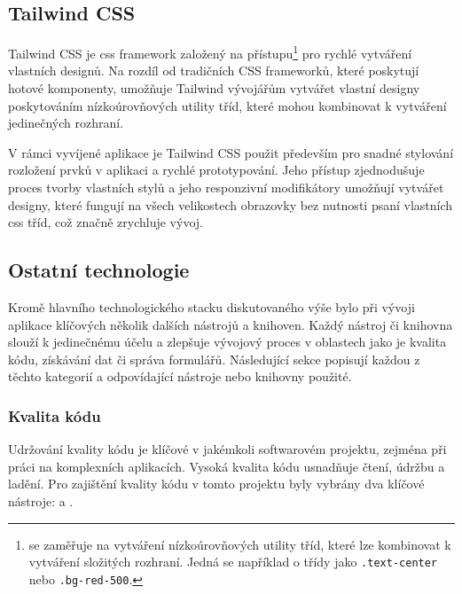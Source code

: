 \subsection{Tailwind CSS}
\label{subsec:implementace-technologie-tailwind}
Tailwind CSS je \ac{css} framework založený na  přístupu\footnote{ se zaměřuje na vytváření nízkoúrovňových utility tříd, které lze kombinovat k vytváření složitých rozhraní.
Jedná se například o třídy jako \texttt{.text-center} nebo \texttt{.bg-red-500}.} pro rychlé vytváření vlastních designů.
Na rozdíl od tradičních CSS frameworků, které poskytují hotové komponenty, umožňuje Tailwind vývojářům vytvářet vlastní designy poskytováním nízkoúrovňových utility tříd, které mohou kombinovat k vytváření jedinečných rozhraní\cite{tc__tailwindcss_com}.

V rámci vyvíjené aplikace je Tailwind CSS použit především pro snadné stylování rozložení prvků v aplikaci a rychlé prototypování.
Jeho  přístup zjednodušuje proces tvorby vlastních stylů a jeho responzivní modifikátory umožňují vytvářet designy, které fungují na všech velikostech obrazovky bez nutnosti psaní vlastních \ac{css} tříd\cite{tc__tailwindcss_com}, což značně zrychluje vývoj.

\subsection{Ostatní technologie}
\label{subsec:implementace-technologie-ostatni}
Kromě hlavního technologického stacku diskutovaného výše bylo při vývoji aplikace klíčových několik dalších nástrojů a knihoven.
Každý nástroj či knihovna slouží k jedinečnému účelu a zlepšuje vývojový proces v oblastech jako je kvalita kódu, získávání dat či správa formulářů.
Následující sekce popisují každou z těchto kategorií a odpovídající nástroje nebo knihovny použité.

\subsubsection{Kvalita kódu}
\label{subsubsec:implementace-technologie-ostatni-kvalita}
Udržování kvality kódu je klíčové v jakémkoli softwarovém projektu, zejména při práci na komplexních aplikacích.
Vysoká kvalita kódu usnadňuje čtení, údržbu a ladění.
Pro zajištění kvality kódu v tomto projektu byly vybrány dva klíčové nástroje:  a .

